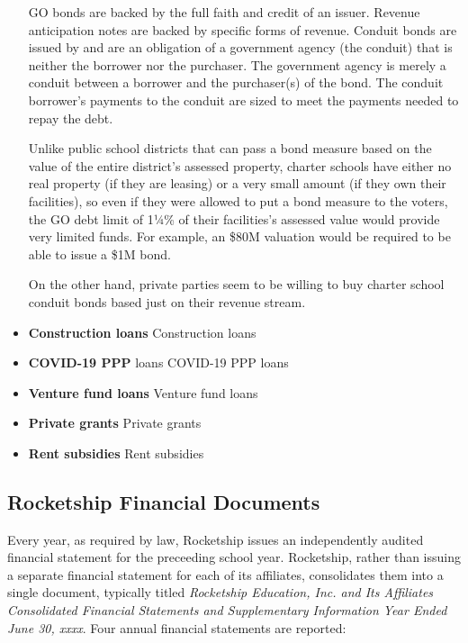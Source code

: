 \begin{itemize}
  GO bonds are backed by the full faith and credit of an issuer.  Revenue anticipation notes are backed by specific forms of revenue. Conduit bonds are issued by and are an obligation of a government agency (the conduit) that is neither the borrower nor the purchaser. The government agency is merely a conduit between a borrower and the purchaser(s) of the bond. The conduit borrower's payments to the conduit are sized to meet the payments needed to repay the debt.

  Unlike public school districts that can pass a bond measure based on the value of the entire district's assessed property, charter schools have either no real property (if they are leasing) or a very small amount (if they own their facilities), so even if they were allowed to put a bond measure to the voters, the GO debt limit of 1¼\% of their facilities's assessed value would provide very limited funds. For example, an \$80M valuation would be required to be able to issue a \$1M bond.

  On the other hand, private parties seem to be willing to buy charter school conduit bonds based just on their revenue stream.
 
  \item \textbf{Construction loans}  Construction loans\\
  \item \textbf{COVID-19 PPP} loans COVID-19 PPP loans\\
  \item \textbf{Venture fund loans} Venture fund loans\\
  \item \textbf{Private grants} Private grants\\
  \item \textbf{Rent subsidies} Rent subsidies\\
\end{itemize}

\subsection{Rocketship Financial Documents}\label{sec:rocketship-financial-docs}\indent

Every year, as required by law, Rocketship issues an independently audited financial statement for the preceeding school year. Rocketship, rather than issuing a separate financial statement for each of its affiliates, consolidates them into a single document, typically titled \emph{Rocketship Education, Inc. and Its Affiliates Consolidated Financial Statements and Supplementary Information Year Ended June 30, xxxx}. Four annual financial statements are reported:

